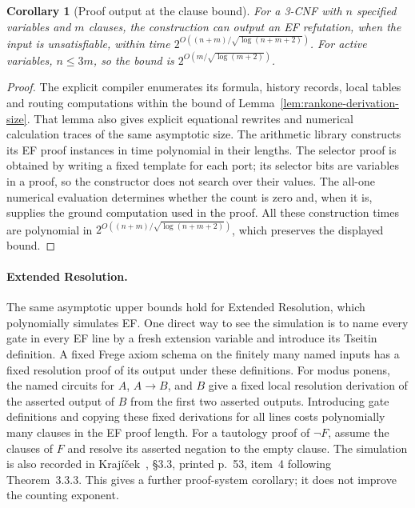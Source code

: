 \documentclass[11pt]{article}
\newtheorem{corollary}[theorem]{Corollary}
\theoremstyle{definition}
\theoremstyle{remark}
\begin{document}
\begin{corollary}[Proof output at the clause bound]
\label{cor:ef-proof-output}
For a 3-CNF with $n$ specified variables and $m$ clauses, the
construction can output an EF refutation, when the input is
unsatisfiable, within time
$2^{O((n+m)/\sqrt{\log(n+m+2)})}$. For active variables,
$n\le3m$, so the bound is $2^{O(m/\sqrt{\log(m+2)})}$.
\end{corollary}
\begin{proof}
The explicit compiler enumerates its formula, history records,
local tables and routing computations within the bound of
Lemma~\ref{lem:rankone-derivation-size}. That lemma also gives
explicit equational rewrites and numerical calculation traces of
the same asymptotic size. The arithmetic library constructs its
EF proof instances in time polynomial in their lengths. The
selector proof is obtained by writing a fixed template for each
port; its selector bits are variables in a proof, so the
constructor does not search over their values. The all-one
numerical evaluation determines whether the count is zero and,
when it is, supplies the ground computation used in the proof.
All these construction times are polynomial in
$2^{O((n+m)/\sqrt{\log(n+m+2)})}$, which preserves the
displayed bound.
\end{proof}

\paragraph{Extended Resolution.}
The same asymptotic upper bounds hold for Extended Resolution,
which polynomially simulates EF. One direct way to see the
simulation is to name every gate in every EF line by a fresh
extension variable and introduce its Tseitin definition. A fixed
Frege axiom schema on the finitely many named inputs has a
fixed resolution proof of its output under these definitions.
For modus ponens, the named circuits for $A$, $A\to B$, and
$B$ give a fixed local resolution derivation of the asserted
output of $B$ from the first two asserted outputs. Introducing
gate definitions and copying these fixed derivations for all
lines costs polynomially many clauses in the EF proof length.
For a tautology proof of $\neg F$, assume the clauses of $F$
and resolve its asserted negation to the empty clause. The
simulation is also recorded in Kraj\'i\v{c}ek~\cite{krajicek}, \S3.3,
printed p.~53, item~4 following Theorem~3.3.3. This gives a further
proof-system corollary; it does not improve the counting exponent.
\end{document}
